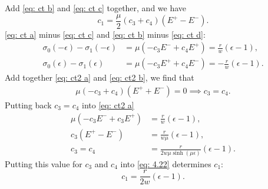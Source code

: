\documentclass[reqno]{amsart}
\numberwithin{equation}{section}
\theoremstyle{definition}
\begin{document}
Add \cref{eq: ct b} and \cref{eq: ct c} together, and we have 
\begin{equation}
c_1 = \frac\mu2\left(c_3 + c_4\right)(E^+-E^-). \label{eq: 4.22}
\end{equation}
\cref{eq: ct a} minus \cref{eq: ct c} and \cref{eq: ct b} minus \cref{eq: ct d}:
\begin{subequations}
\begin{align}
\sigma_0(-\epsilon)-\sigma_1(-\epsilon) &= \mu \left(-c_3 E^- + c_4 E^+  \right) = \frac{r}{w}(\epsilon - 1), \label{eq: ct2 a} \\
\sigma_0(\epsilon)- \sigma_1(\epsilon) &= \mu\left(-c_3 E^+ + c_4 E^-\right) =- \frac{r}{w}(\epsilon - 1).  \label{eq: ct2 b}
\end{align}
\end{subequations}
Add together \cref{eq: ct2 a} and \cref{eq: ct2 b}, we find that
\begin{align}
 \mu(-c_3 + c_4)(E^+ + E^-) =0 \implies c_3 = c_4.
\end{align}
Putting back $c_3 = c_4$ into \cref{eq: ct2 a}
\begin{subequations}
\begin{align}
\mu \left(-c_3 E^- + c_3 E^+  \right) &= \frac{r}{w}(\epsilon - 1), \\
c_3 (E^+ - E^- )  &=  \frac{r}{w\mu}(\epsilon - 1), \\
c_3 = c_4 &=  \frac{r}{2w\mu\sinh(\mu\epsilon)}(\epsilon - 1).
\end{align}
\end{subequations}
Putting this value for $c_3$ and $c_4$ into \cref{eq: 4.22} determines $c_1$:
\begin{equation}
c_1 = \frac{r}{2w}(\epsilon - 1).
\end{equation}
\end{document}
